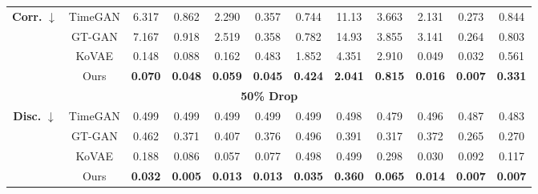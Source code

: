 \documentclass{article}
\theoremstyle{plain}
\theoremstyle{definition}
\theoremstyle{remark}
\begin{document}
{\begin{table*}[!t]
{\begin{tabular}{cc|cccccccccc}
    \multirow{4}{*}{\textbf{Corr.} $\downarrow$} 
      & TimeGAN 
         & 6.317 
         & 0.862 
         & 2.290 
         & 0.357 
         & 0.744 
         & 11.13 
         & 3.663 
         & 2.131 
         & 0.273 
         & 0.844 \\
      & GT-GAN  
         & 7.167 
         & 0.918 
         & 2.519 
         & 0.358 
         & 0.782 
         & 14.93 
         & 3.855 
         & 3.141 
         & 0.264 
         & 0.803 \\
      & KoVAE   
         & 0.148 
         & 0.088 
         & 0.162 
         & 0.483 
         & 1.852 
         & 4.351 
         & 2.910 
         & 0.049 
         & 0.032 
         & 0.561 \\
      & Ours    
         & \cellcolor{blue!10}\textbf{0.070}
         & \cellcolor{blue!10}\textbf{0.048}
         & \cellcolor{blue!10}\textbf{0.059}
         & \cellcolor{blue!10}\textbf{0.045}
         & \cellcolor{blue!10}\textbf{0.424}
         & \cellcolor{blue!10}\textbf{2.041}
         & \cellcolor{blue!10}\textbf{0.815}
         & \cellcolor{blue!10}\textbf{0.016}
         & \cellcolor{blue!10}\textbf{0.007}
         & \cellcolor{blue!10}\textbf{0.331} \\
    \midrule
    
    \multicolumn{12}{c}{\textbf{50\% Drop}} \\[3pt]
    \midrule
    \multirow{4}{*}{\textbf{Disc.} $\downarrow$} 
      & TimeGAN 
         & 0.499 
         & 0.499 
         & 0.499 
         & 0.499 
         & 0.499 
         & 0.498 
         & 0.479 
         & 0.496 
         & 0.487 
         & 0.483 \\
      & GT-GAN  
         & 0.462 
         & 0.371 
         & 0.407 
         & 0.376 
         & 0.496 
         & 0.391 
         & 0.317 
         & 0.372 
         & 0.265 
         & 0.270 \\
      & KoVAE   
         & 0.188 
         & 0.086 
         & 0.057 
         & 0.077 
         & 0.498 
         & 0.499 
         & 0.298 
         & 0.030 
         & 0.092 
         & 0.117 \\
      & Ours    
         & \cellcolor{blue!10}\textbf{0.032}
         & \cellcolor{blue!10}\textbf{0.005}
         & \cellcolor{blue!10}\textbf{0.013}
         & \cellcolor{blue!10}\textbf{0.013}
         & \cellcolor{blue!10}\textbf{0.035}
         & \cellcolor{blue!10}\textbf{0.360}
         & \cellcolor{blue!10}\textbf{0.065}
         & \cellcolor{blue!10}\textbf{0.014}
         & \cellcolor{blue!10}\textbf{0.007}
         & \cellcolor{blue!10}\textbf{0.007} \\
    \midrule
    

\end{tabular}}
\end{table*}}
\end{document}
